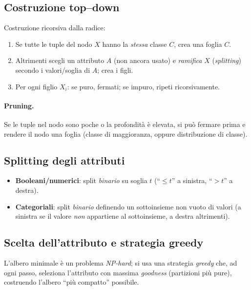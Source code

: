 \newpage
\subsection{Costruzione top–down}\label{subsec:topdown}
Costruzione ricorsiva dalla radice:
\begin{enumerate}
  \item Se tutte le tuple del nodo $X$ hanno la \emph{stessa} classe $C$, crea una foglia $C$.
  \item Altrimenti scegli un attributo $A$ (non ancora usato) e \emph{ramifica} $X$ (\emph{splitting}) secondo i valori/soglia di $A$; crea i figli.
  \item Per ogni figlio $X_i$: se puro, fermati; se impuro, ripeti ricorsivamente.
\end{enumerate}

\paragraph{Pruning.}
Se le tuple nel nodo sono poche o la profondità è elevata, si può fermare prima e rendere il nodo una foglia (classe di maggioranza, oppure distribuzione di classe).

\subsection{Splitting degli attributi}\label{subsec:splitting}
\begin{itemize}
  \item \textbf{Booleani/numerici}: split \emph{binario} su soglia $t$ (``$\le t$'' a sinistra, ``$>t$'' a destra).
  \item \textbf{Categoriali}: split \emph{binario} definendo un sottoinsieme non vuoto di valori (a sinistra se il valore \emph{non} appartiene al sottoinsieme, a destra altrimenti).
\end{itemize}

\subsection{Scelta dell’attributo e strategia greedy}\label{subsec:greedy}
L’albero minimale è un problema \emph{NP-hard}; si usa una strategia \emph{greedy} che, ad ogni passo, seleziona l’attributo con massima \emph{goodness} (partizioni più pure),
costruendo l’albero “più compatto” possibile.

